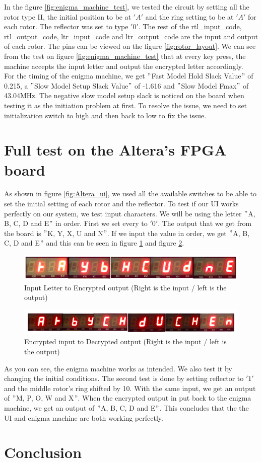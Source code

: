 \documentclass[10pt]{article}
\begin{document}
In the figure \ref{fig:enigma_machine_test}, we tested the circuit by setting all the rotor type II, the initial position to be at $'A'$ and the ring setting to be at $'A'$ for each rotor. The reflector was set to type $'0'$. The rest of the rtl\_input\_code, rtl\_output\_code, ltr\_input\_code and ltr\_output\_code are the input and output of each rotor. The pins can be viewed on the figure \ref{fig:rotor_layout}. We can see from the test on figure \ref{fig:enigma_machine_test} that at every key press, the machine accepts the input letter and output the encrypted letter accordingly.\\
For the timing of the enigma machine, we get $"$Fast Model Hold Slack Value$"$ of 0.215, a $"$Slow Model Setup Slack Value$"$ of -1.616 and $"$Slow Model Fmax$"$ of 43.04MHz. The negative slow model setup slack is noticed on the board when testing it as the initiation problem at first. To resolve the issue, we need to set initialization switch to high and then back to low to fix the issue.

\section{Full test on the Altera's FPGA board}
As shown in figure \ref{fig:Altera_ui}, we used all the available switches to be able to set the initial setting of each rotor and the reflector. To test if our UI works perfectly on our system, we test input characters. We will be using the letter $"$A, B, C, D and E$"$ in order. First we set every to $'0'$. The output that we get from the board is $"$K, Y, X, U and N$"$. If we input the value in order, we get $"$A, B, C, D and E$"$ and this can be seen in figure \ref{fig:letter_encrypt} and figure \ref{fig:encrypt_letter}.
\begin{figure}[!htb]
    \centering
    \includegraphics[width=1\textwidth]{./letter_encrypt.png}
    \caption{Input Letter to Encrypted output (Right is the input / left is the output)}
    \label{fig:letter_encrypt}
\end{figure}
\begin{figure}[!htb]
    \centering
    \includegraphics[width=1\textwidth]{./encrypt_letter.png}
    \caption{Encrypted input to Decrypted output (Right is the input / left is the output)}
    \label{fig:encrypt_letter}
\end{figure}
As you can see, the enigma machine works as intended. We also test it by changing the initial conditions. The second test is done by setting reflector to $'1'$ and the middle rotor's ring shifted by 10. With the same input, we get an output of $"$M, P, O, W and X$"$. When the encrypted output in put back to the enigma machine, we get an output of $"$A, B, C, D and E$"$. This concludes that the the UI and enigma machine are both working perfectly.

\section{Conclusion}
\end{document}
